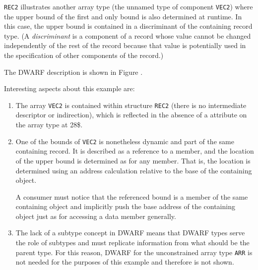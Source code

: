 \texttt{REC2} illustrates another array type (the unnamed type of
component \texttt{VEC2}) where the upper bound of the first and only
bound is also determined at runtime. In this case, the upper
bound is contained in a discriminant of the containing record
type. (A \textit{discriminant} is a component of a record whose value
cannot be changed independently of the rest of the record
because that value is potentially used in the specification
of other components of the record.)

The DWARF description is shown in 
Figure .


Interesting aspects about this example are:
\begin{enumerate}[1. ]
\item The array \texttt{VEC2} is  contained within structure
\texttt{REC2} (there is no intermediate descriptor or indirection),
which is reflected in the absence of a \DWATdatalocation{}
attribute on the array type at 28\$.

\item One of the bounds of \texttt{VEC2} is nonetheless dynamic and part of
the same containing record. It is described as a reference to
a member, and the location of the upper bound is determined
as for any member. That is, the location is determined using
an address calculation relative to the base of the containing
object.  

A consumer must notice that the referenced bound is a
member of the same containing object and implicitly push the
base address of the containing object just as for accessing
a data member generally.

\item The lack of a subtype concept in DWARF means that DWARF types
serve the role of subtypes and must replicate information from
what should be the parent type. For this reason, DWARF for
the unconstrained array type \texttt{ARR} is not needed for the purposes
of this example and therefore is not shown.
\end{enumerate}

